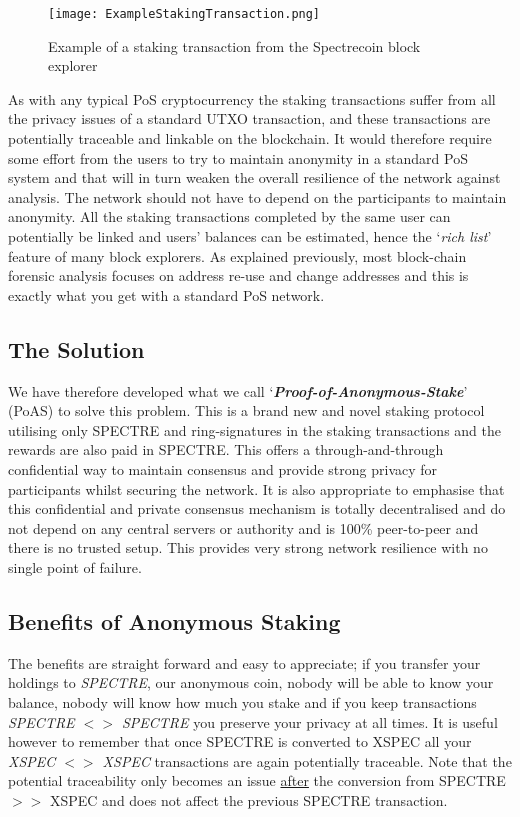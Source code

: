\begin{figure}[h]
	\caption{Example of a staking transaction from the Spectrecoin block explorer}
	\centering
	\texttt{[image: ExampleStakingTransaction.png]}
\end{figure}



As with any typical PoS cryptocurrency the staking transactions suffer
from all the privacy issues of a standard UTXO transaction, and these
transactions are potentially traceable and linkable on the blockchain.
It would therefore require some effort from the users to try to maintain
anonymity in a standard PoS system and that will in turn weaken the overall
resilience of the network against analysis. The network should not have to
depend on the participants to maintain anonymity. All the staking
transactions completed by the same user can potentially be linked and users’
balances can be estimated, hence the ‘\textit{rich list}’ feature of many
block explorers. As explained previously, most block-chain forensic analysis
focuses on address re-use and change addresses and this is exactly what you
get with a standard PoS network.



\subsection{The Solution}
We have therefore developed what we call ‘\textbf{\textit{Proof-of-Anonymous-Stake}}’
(PoAS) to solve this problem. This is a brand new and novel staking protocol
utilising only SPECTRE and ring-signatures in the staking transactions and
the rewards are also paid in SPECTRE. This offers a through-and-through
confidential way to maintain consensus and provide strong privacy for
participants whilst securing the network. It is also appropriate to emphasise
that this confidential and private consensus mechanism is totally
decentralised and do not depend on any central servers or authority and is
100\% peer-to-peer and there is no trusted setup. This provides very strong
network resilience with no single point of failure.



\subsection{Benefits of Anonymous Staking}
The benefits are straight forward and easy to appreciate; if you transfer
your holdings to \textit{SPECTRE}, our anonymous coin, nobody will be able
to know your balance, nobody will know how much you stake and if you keep
transactions \textit{SPECTRE $<>$ SPECTRE} you preserve your privacy at all
times. It is useful however to remember that once SPECTRE is converted to
XSPEC all your \textit{XSPEC $<>$ XSPEC} transactions are again potentially
traceable. Note that the potential traceability only becomes an issue
\underline{after} the conversion from SPECTRE $>>$ XSPEC and does not affect
the previous SPECTRE transaction.



